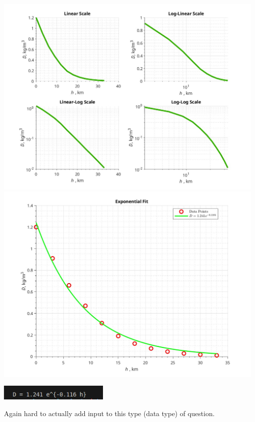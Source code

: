 \documentclass[a4paper, 12pt]{report}
\def\link{blue!50!black}
\begin{document}


\includegraphics[width=1\textwidth]{main/graphs_images/subplts.jpeg}
\includegraphics[width=1\textwidth]{main/graphs_images/fitted_curve.jpeg}
\begin{center}
    \includegraphics[width=0.4\textwidth]{main/graphs_images/2screen.png}
\end{center}
Again hard to actually add input to this type (data type) of question.
\end{document}
